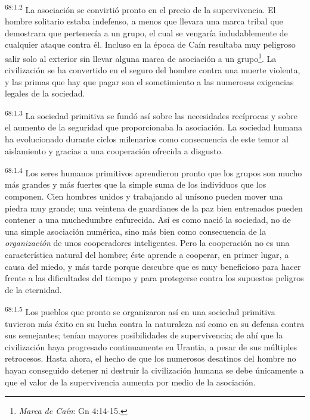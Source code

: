 \par
\textsuperscript{68:1.2} La asociación se convirtió pronto en el precio de la supervivencia. El hombre solitario estaba indefenso, a menos que llevara una marca tribal que demostrara que pertenecía a un grupo, el cual se vengaría indudablemente de cualquier ataque contra él. Incluso en la época de Caín resultaba muy peligroso salir solo al exterior sin llevar alguna marca de asociación a un grupo\footnote{\textit{Marca de Caín}: Gn 4:14-15.}. La civilización se ha convertido en el seguro del hombre contra una muerte violenta, y las primas que hay que pagar son el sometimiento a las numerosas exigencias legales de la sociedad.

\par
\textsuperscript{68:1.3} La sociedad primitiva se fundó así sobre las necesidades recíprocas y sobre el aumento de la seguridad que proporcionaba la asociación. La sociedad humana ha evolucionado durante ciclos milenarios como consecuencia de este temor al aislamiento y gracias a una cooperación ofrecida a disgusto.

\par
\textsuperscript{68:1.4} Los seres humanos primitivos aprendieron pronto que los grupos son mucho más grandes y más fuertes que la simple suma de los individuos que los componen. Cien hombres unidos y trabajando al unísono pueden mover una piedra muy grande; una veintena de guardianes de la paz bien entrenados pueden contener a una muchedumbre enfurecida. Así es como nació la sociedad, no de una simple asociación numérica, sino más bien como consecuencia de la \textit{organización} de unos cooperadores inteligentes. Pero la cooperación no es una característica natural del hombre; éste aprende a cooperar, en primer lugar, a causa del miedo, y más tarde porque descubre que es muy beneficioso para hacer frente a las dificultades del tiempo y para protegerse contra los supuestos peligros de la eternidad.

\par
\textsuperscript{68:1.5} Los pueblos que pronto se organizaron así en una sociedad primitiva tuvieron más éxito en su lucha contra la naturaleza así como en su defensa contra sus semejantes; tenían mayores posibilidades de supervivencia; de ahí que la civilización haya progresado continuamente en Urantia, a pesar de sus múltiples retrocesos. Hasta ahora, el hecho de que los numerosos desatinos del hombre no hayan conseguido detener ni destruir la civilización humana se debe únicamente a que el valor de la supervivencia aumenta por medio de la asociación.

